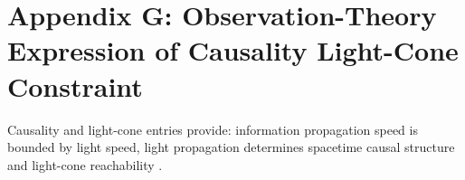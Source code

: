 \section{Appendix G: Observation-Theory Expression of Causality Light-Cone Constraint}

Causality and light-cone entries provide: information propagation speed is bounded by light speed, light propagation determines spacetime causal structure and light-cone reachability \cite{EinsteinOnlineCausal}.
